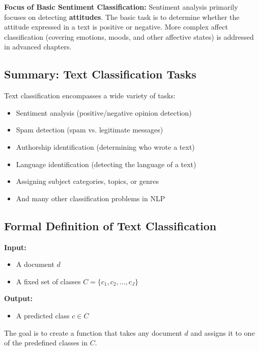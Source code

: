 \documentclass[11pt,a4paper]{article}
\theoremstyle{definition}
\theoremstyle{plain}
\theoremstyle{remark}
\begin{document}
\textbf{Focus of Basic Sentiment Classification:}
Sentiment analysis primarily focuses on detecting \textbf{attitudes}. The basic task is to determine whether the attitude expressed in a text is positive or negative. More complex affect classification (covering emotions, moods, and other affective states) is addressed in advanced chapters.

\subsection{Summary: Text Classification Tasks}

Text classification encompasses a wide variety of tasks:
\begin{itemize}
    \item Sentiment analysis (positive/negative opinion detection)
    \item Spam detection (spam vs. legitimate messages)
    \item Authorship identification (determining who wrote a text)
    \item Language identification (detecting the language of a text)
    \item Assigning subject categories, topics, or genres
    \item And many other classification problems in NLP
\end{itemize}

\subsection{Formal Definition of Text Classification}

\begin{tcolorbox}[colback=blue!5!white,colframe=blue!75!black,title=\textbf{Text Classification Problem}]
\textbf{Input:}
\begin{itemize}
    \item A document $d$
    \item A fixed set of classes $C = \{c_1, c_2, \ldots, c_J\}$
\end{itemize}

\textbf{Output:}
\begin{itemize}
    \item A predicted class $c \in C$
\end{itemize}
\end{tcolorbox}

The goal is to create a function that takes any document $d$ and assigns it to one of the predefined classes in $C$.
\end{document}
